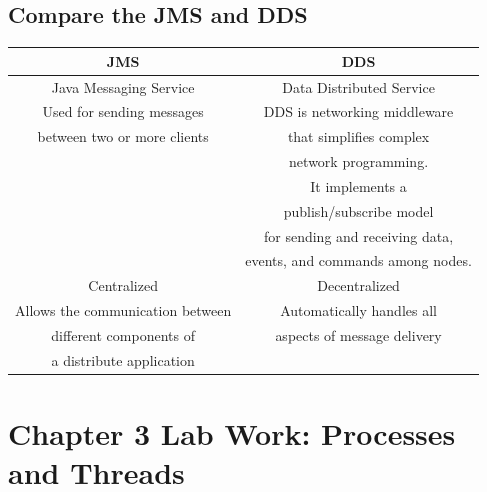 \documentclass[11pt,a4paper]{report}
\begin{document}
	\section{Compare the JMS and DDS}
	\begin{tabular}{|c|c|}
	\hline 
	JMS & DDS \\ 
	\hline 
	Java Messaging Service & Data Distributed Service \\ 
	\hline 
	Used for sending messages & DDS is networking middleware \\ between two or more clients & that simplifies complex \\&network programming. \\&It implements a \\& publish/subscribe model  \\&for sending and receiving data, \\&events, and commands among nodes. \\
	\hline 
	Centralized & Decentralized \\ 
	\hline 
	Allows the communication between & Automatically handles all\\ different components of  & aspects of message delivery \\ a distribute application &\\
	\hline 
	\end{tabular}
	
	\chapter{Chapter 3 Lab Work: Processes and Threads}
	\newpage
\end{document}
